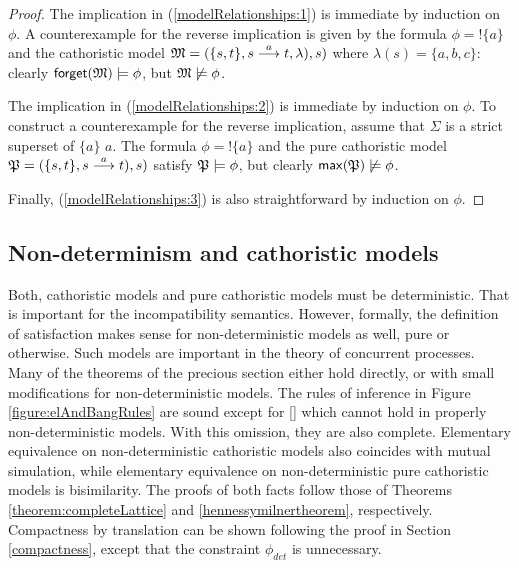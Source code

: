 \begin{proof}
The implication in (\ref{modelRelationships:1}) is immediate by
induction on $\phi$. A counterexample for the reverse implication is
given by the formula $\phi = !\{a\}$ and the cathoristic model $\frak{M} = ( \{s,
t\}, s \stackrel{a}{\longrightarrow} t, \lambda), s)$ where $\lambda (s) = \{a, b, c\}$:
clearly $\mathsf{forget}(\frak{M}) \models \phi$, but $\frak{M} \not\models
\phi$.

The implication in (\ref{modelRelationships:2}) is immediate by
induction on $\phi$. To construct a counterexample for the reverse
implication, assume that $\Sigma$ is a strict superset of $\{a\}$
$a$. The formula $\phi = !\{a\}$ and the pure cathoristic model $\frak{P} = (
\{s, t\}, s \stackrel{a}{\longrightarrow} t ), s)$ satisfy $\frak{P} \models \phi$, but clearly
$\mathsf{max}(\frak{P}) \not\models \phi$.

Finally, (\ref{modelRelationships:3}) is also straightforward by
induction on $\phi$.

\end{proof}

\subsection{Non-determinism and cathoristic models}

Both, cathoristic models and pure cathoristic models must be deterministic. That
is important for the incompatibility semantics. However, formally, the
definition of satisfaction makes sense for non-deterministic models as
well, pure or otherwise. Such models are important in the theory of
concurrent processes. Many of the theorems of the precious section
either hold directly, or with small modifications for
non-deterministic models. The rules of inference in Figure
\ref{figure:elAndBangRules} are sound except for
    [] which cannot hold in properly
    non-deterministic models. With this omission, they are also
    complete.  Elementary equivalence on non-deterministic cathoristic
    models also coincides with mutual simulation, while elementary
    equivalence on non-deterministic pure cathoristic models is
    bisimilarity. The proofs of both facts follow those of Theorems
    \ref{theorem:completeLattice} and \ref{hennessymilnertheorem},
    respectively. Compactness by translation can be shown following
    the proof in Section \ref{compactness}, except that the constraint
    $\phi_{det}$ is unnecessary.

